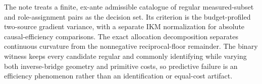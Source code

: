 The note treats a finite, ex-ante admissible catalogue of regular measured-subset and role-assignment pairs as the decision set. Its criterion is the budget-profiled two-source gradient variance, with a separate IKM normalization for absolute causal-efficiency comparisons. The exact allocation decomposition separates continuous curvature from the nonnegative reciprocal-floor remainder. The binary witness keeps every candidate regular and commonly identifying while varying both inverse-bridge geometry and primitive costs, so predictive failure is an efficiency phenomenon rather than an identification or equal-cost artifact.